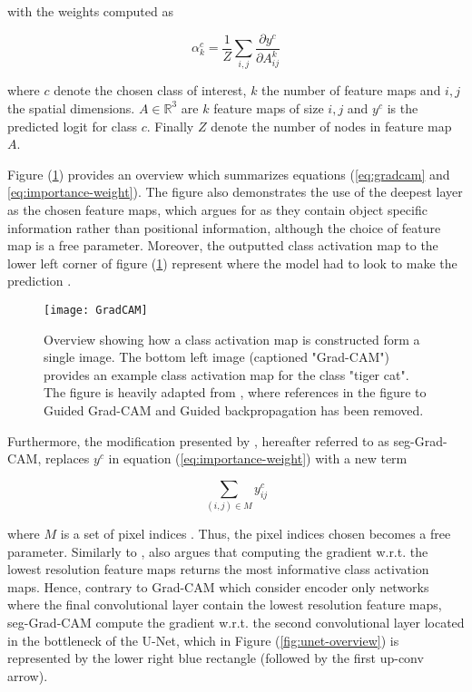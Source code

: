 \documentclass[../main/thesis.tex]{subfiles}
\begin{document}
with the weights computed as

\begin{equation}
    \label{eq:importance-weight}
    \alpha_k^c = \frac{1}{Z} \sum_{i,j} \frac{\partial{y^c}}{\partial{A_{ij}^k}}
\end{equation}

where $c$ denote the chosen class of interest, $k$ the number of feature maps and $i,j$ the spatial dimensions. $A \in \mathbb{R}^3$ are $k$ feature maps of size $i,j$ and $y^c$ is the predicted logit for class $c$. Finally $Z$ denote the number of nodes in feature map $A$. 

Figure (\ref{fig:gradcam}) provides an overview which summarizes equations (\ref{eq:gradcam} and \ref{eq:importance-weight}). The figure also demonstrates the use of the deepest layer as the chosen feature maps, which \citet{Selvaraju2016} argues for as they contain object specific information rather than positional information, although the choice of feature map is a free parameter. Moreover, the outputted class activation map to the lower left corner of figure (\ref{fig:gradcam}) represent where the model had to look to make the prediction \citep{Selvaraju2016}.

\begin{figure}
    \centering
    \texttt{[image: GradCAM]}
    \caption{\label{fig:gradcam}Overview showing how a class activation map is constructed form a single image. The bottom left image (captioned "Grad-CAM") provides an example class activation map for the class "tiger cat". The figure is heavily adapted from \protect\citep{Selvaraju2016}, where references in the figure to Guided Grad-CAM and Guided backpropagation has been removed.}
\end{figure}

Furthermore, the modification presented by \citet{Vinogradova2020}, hereafter referred to as seg-Grad-CAM, replaces $y^c$ in equation (\ref{eq:importance-weight}) with a new term 

\begin{equation}
    \sum_{(i,j) \in M} y_{ij}^c
\end{equation}

where $M$ is a set of pixel indices \citep{Vinogradova2020}. Thus, the pixel indices chosen becomes a free parameter. Similarly to \citep{Selvaraju2016}, \citet{Vinogradova2020} also argues that computing the gradient w.r.t. the lowest resolution feature maps returns the most informative class activation maps. Hence, contrary to Grad-CAM which consider encoder only networks where the final convolutional layer contain the lowest resolution feature maps, seg-Grad-CAM compute the gradient w.r.t. the second convolutional layer located in the bottleneck of the U-Net, which in Figure (\ref{fig:unet-overview}) is represented by the lower right blue rectangle (followed by the first up-conv arrow).

\biblio
\end{document}
